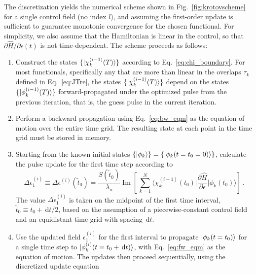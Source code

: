 \documentclass[submission, Phys]{SciPost}
\newcommand{\Op}[1]{\hat{#1}}
\newcommand{\dd}[0]{\,\text{d}}
\renewcommand{\Im}[0]{\operatorname{Im}}
\begin{document}
The discretization yields the numerical scheme shown in
Fig.~\ref{fig:krotovscheme} for a single control field (no index $l$), and
assuming the first-order update is sufficient to guarantee monotonic convergence
for the chosen functional.
For simplicity, we also assume that the Hamiltonian is linear in the control, so
that $\partial \Op{H} / \partial \epsilon(t)$ is not time-dependent.
The scheme proceeds as follows:
\begin{enumerate}
  \item
    Construct the states $\{\ket{\chi^{(i-1)}_k(T)}\}$ according to
    Eq.~\eqref{eq:chi_boundary}.
    For most functionals, specifically any that are more than linear in the
    overlaps $\tau_k$ defined in Eq.~\eqref{eq:JTre}, the states
    $\{\ket{\chi^{(i-1)}_k(T)}\}$ depend on the states
    $\{\ket{\phi^{(i-1)}_k(T)}\}$ forward-propagated under the optimized pulse
    from the previous iteration, that is, the guess pulse in the current
    iteration.
  \item
    Perform a backward propagation using Eq.~\eqref{eq:bw_eqm} as the equation
    of motion over the entire time grid.
    The resulting state at each point in the time grid must be stored in memory.
  \item
    Starting from the known initial states $\{\ket{\phi_k}\} =
    \{\ket{\phi_k(t=t_0=0)}\}$, calculate the pulse update for the first time
    step according to
    \begin{equation}%
      \label{eq:update_discretized0}
      \Delta\epsilon^{(i)}_1
      \equiv \Delta\epsilon^{(i)}(\tilde{t}_0)
      = \frac{S(\tilde{t}_0)}{\lambda_{a}} \Im \left[\,
          \sum_{k=1}^{N} \bigg\langle \chi_k^{(i-1)}(t_0) \bigg\vert
          \frac{\partial \Op{H}}{\partial \epsilon}
          \bigg\vert \phi_k(t_0) \bigg\rangle
        \right]\,.
    \end{equation}
    The value $\Delta\epsilon^{(i)}_1 $
    is taken on the midpoint of the first time interval,
    $\tilde{t}_0 \equiv t_0 + \dd t/2$, based on the assumption
    of a piecewise-constant control field and an equidistant time grid with
    spacing $\dd t$.
  \item
    Use the updated field $\epsilon^{(i)}_1$ for the first interval
    to propagate \(\ket{\phi_k(t=t_0)}\) for a single time step to
    \(\ket{\phi_k^{(i)}(t=t_0 + \dd t)}\), with Eq.~\eqref{eq:fw_eqm} as the
    equation of motion.
    The updates then proceed sequentially, using the discretized update
    equation
    \begin{equation}%

\end{equation}
\end{enumerate}
\end{document}
